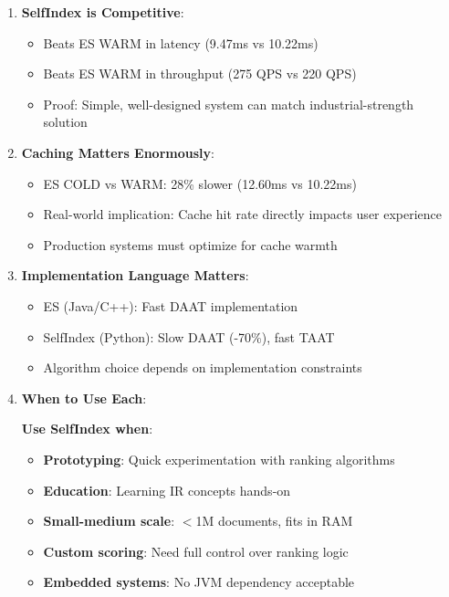 \documentclass[12pt,a4paper]{article}
\begin{document}
\begin{enumerate}
    \item \textbf{SelfIndex is Competitive}:
    \begin{itemize}
        \item Beats ES WARM in latency (9.47ms vs 10.22ms)
        \item Beats ES WARM in throughput (275 QPS vs 220 QPS)
        \item Proof: Simple, well-designed system can match industrial-strength solution
    \end{itemize}
    
    \item \textbf{Caching Matters Enormously}:
    \begin{itemize}
        \item ES COLD vs WARM: 28\% slower (12.60ms vs 10.22ms)
        \item Real-world implication: Cache hit rate directly impacts user experience
        \item Production systems must optimize for cache warmth
    \end{itemize}
    
    \item \textbf{Implementation Language Matters}:
    \begin{itemize}
        \item ES (Java/C++): Fast DAAT implementation
        \item SelfIndex (Python): Slow DAAT (-70\%), fast TAAT
        \item Algorithm choice depends on implementation constraints
    \end{itemize}
    
    \item \textbf{When to Use Each}:
    
    \textbf{Use SelfIndex when}:
    \begin{itemize}
        \item \textbf{Prototyping}: Quick experimentation with ranking algorithms
        \item \textbf{Education}: Learning IR concepts hands-on
        \item \textbf{Small-medium scale}: $<$1M documents, fits in RAM
        \item \textbf{Custom scoring}: Need full control over ranking logic
        \item \textbf{Embedded systems}: No JVM dependency acceptable
    \end{itemize}
    

\end{enumerate}
\end{document}
